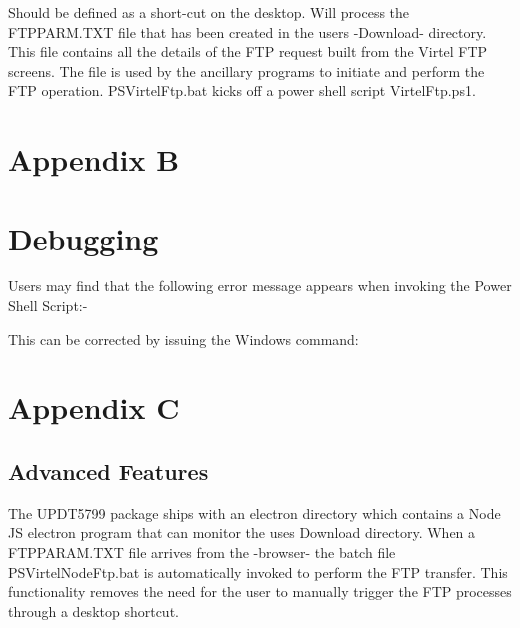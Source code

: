 \documentclass[letterpaper,10pt,english]{sphinxmanual}
\begin{document}
Should be defined as a short-cut on the desktop. Will process the FTPPARM.TXT file that has been created in the users -Download- directory. This file contains all the details of the FTP request built from the Virtel FTP screens. The file is used by the ancillary programs to initiate and perform the FTP operation. PSVirtelFtp.bat kicks off a power shell script VirtelFtp.ps1.

\begin{sphinxVerbatim}[commandchars=\\\{\}]
 
 \PYGZbs{}\PYGZbs{} \PYGZbs{}\PYGZbs{}
      
  \PYGZbs{}\PYGZbs{}
\end{sphinxVerbatim}


\chapter{Appendix B}
\label{\detokenize{TN201905:appendix-b}}

\chapter{Debugging}
\label{\detokenize{TN201905:debugging}}

Users may find that the following error message appears when invoking the Power Shell Script:-


This can be corrected by issuing the Windows command: 


\chapter{Appendix C}
\label{\detokenize{TN201905:appendix-c}}

\section{Advanced Features}
\label{\detokenize{TN201905:advanced-features}}
The UPDT5799 package ships with an electron directory which contains a Node JS electron program that can monitor the uses Download directory. When a FTPPARAM.TXT file arrives from the -browser- the batch file PSVirtelNodeFtp.bat is automatically invoked to perform the FTP transfer. This functionality removes the need for the user to manually trigger the FTP processes through a desktop shortcut.
\end{document}
